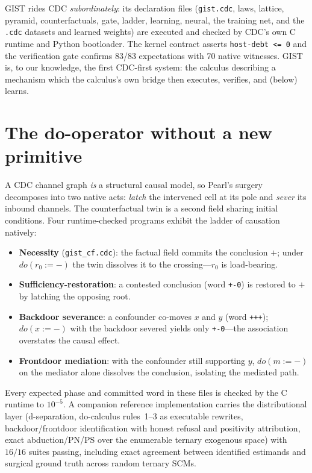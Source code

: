\documentclass[11pt]{article}
\begin{document}
GIST rides CDC \emph{subordinately}: its declaration files
(\texttt{gist.cdc}, laws, lattice, pyramid, counterfactuals, gate,
ladder, learning, neural, the training net, and the \texttt{.cdc}
datasets and learned weights) are executed and checked by CDC's own C
runtime and Python bootloader. The kernel contract asserts
\texttt{host-debt <= 0} and the verification gate confirms 83/83
expectations with 70 native witnesses. GIST is, to our knowledge, the
first CDC-first system: the calculus describing a mechanism which the
calculus's own bridge then executes, verifies, and (below) learns.

\section{The do-operator without a new primitive}

A CDC channel graph \emph{is} a structural causal model, so Pearl's
surgery~\cite{pearl} decomposes into two native acts: \emph{latch} the
intervened cell at its pole and \emph{sever} its inbound channels. The
counterfactual twin is a second field sharing initial conditions. Four
runtime-checked programs exhibit the ladder of causation natively:

\begin{itemize}
\item \textbf{Necessity} (\texttt{gist\_cf.cdc}): the factual field
commits the conclusion $+$; under $do(r_0{:=}-)$ the twin dissolves it to
the crossing---$r_0$ is load-bearing.
\item \textbf{Sufficiency-restoration}: a contested conclusion (word
\texttt{+-0}) is restored to $+$ by latching the opposing root.
\item \textbf{Backdoor severance}: a confounder co-moves $x$ and $y$
(word \texttt{+++}); $do(x{:=}-)$ with the backdoor severed yields only
\texttt{+-0}---the association overstates the causal effect.
\item \textbf{Frontdoor mediation}: with the confounder still supporting
$y$, $do(m{:=}-)$ on the mediator alone dissolves the conclusion,
isolating the mediated path.
\end{itemize}

Every expected phase and committed word in these files is checked by the
C runtime to $10^{-5}$. A companion reference implementation carries the
distributional layer (d-separation, do-calculus rules~1--3 as executable
rewrites, backdoor/frontdoor identification with honest refusal and
positivity attribution, exact abduction/PN/PS over the enumerable ternary
exogenous space) with $16/16$ suites passing, including exact agreement
between identified estimands and surgical ground truth across random
ternary SCMs.
\end{document}
